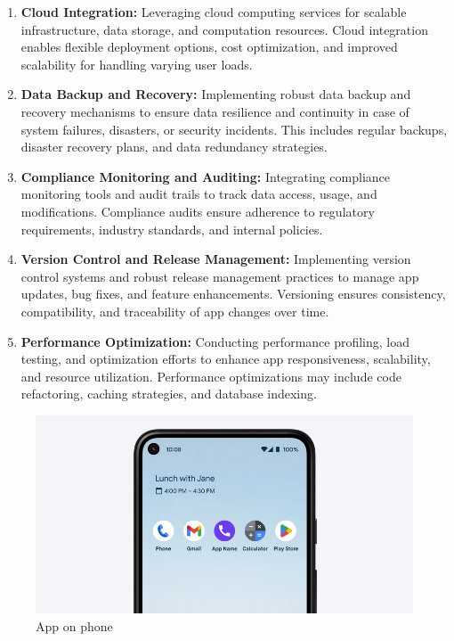 \begin{enumerate}[label=\arabic*.]
    \item \textbf{Cloud Integration:} Leveraging cloud computing services for scalable infrastructure, data storage, and computation resources. Cloud integration enables flexible deployment options, cost optimization, and improved scalability for handling varying user loads.

    \item \textbf{Data Backup and Recovery:} Implementing robust data backup and recovery mechanisms to ensure data resilience and continuity in case of system failures, disasters, or security incidents. This includes regular backups, disaster recovery plans, and data redundancy strategies.
    
    \item \textbf{Compliance Monitoring and Auditing:} Integrating compliance monitoring tools and audit trails to track data access, usage, and modifications. Compliance audits ensure adherence to regulatory requirements, industry standards, and internal policies.
    
    \item \textbf{Version Control and Release Management:} Implementing version control systems and robust release management practices to manage app updates, bug fixes, and feature enhancements. Versioning ensures consistency, compatibility, and traceability of app changes over time.
    
    \item \textbf{Performance Optimization:} Conducting performance profiling, load testing, and optimization efforts to enhance app responsiveness, scalability, and resource utilization. Performance optimizations may include code refactoring, caching strategies, and database indexing.
\end{enumerate}


\begin{figure}
    \centering
    \includegraphics[width=1\linewidth]{Media//phone.png}
    \caption{App on phone}
    \label{fig:App on phone}
\end{figure}